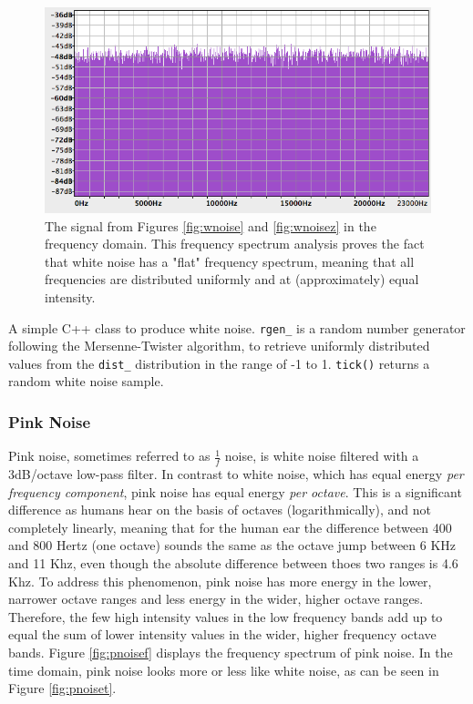 \begin{figure}[ht!]
  \includegraphics[scale=0.6]{img/wnoisef}
  \caption{The signal from Figures \ref{fig:wnoise} and \ref{fig:wnoisez} in the frequency domain. This frequency spectrum analysis proves the fact that white noise has a "flat" frequency spectrum, meaning that all frequencies are  distributed uniformly and at (approximately) equal intensity. }
  \label{fig:wnoisefreq}
\end{figure}

\begin{table}[p!]
  \caption{A simple C++ class to produce white noise. \texttt{rgen\_} is a random number generator following the Mersenne-Twister algorithm, to retrieve uniformly distributed values from the \texttt{dist\_} distribution in the range of -1 to 1. \texttt{tick()} returns a random white noise sample. }
  \label{code:wnoise}
\end{table}

\pagebreak

\subsubsection{Pink Noise}

Pink noise, sometimes referred to as $\frac{1}{f}$ noise, is white noise filtered with a 3dB/octave low-pass filter. In contrast to white noise, which has equal energy \emph{per frequency component}, pink noise has equal energy \emph{per octave}. This is a significant difference as humans hear on the basis of octaves (logarithmically), and not completely linearly, meaning that for the human ear the difference between 400 and 800 Hertz (one octave) sounds the same as the octave jump between 6 KHz and 11 Khz, even though the absolute difference between thoes two ranges is 4.6 Khz. To address this phenomenon, pink noise has more energy in the lower, narrower octave ranges and less energy in the wider, higher octave ranges. Therefore, the few high intensity values in the low frequency bands add up to equal the sum of lower intensity values in the wider, higher frequency octave bands. Figure \ref{fig:pnoisef} displays the frequency spectrum of pink noise. In the time domain, pink noise looks more or less like white noise, as can be seen in Figure \ref{fig:pnoiset}.

